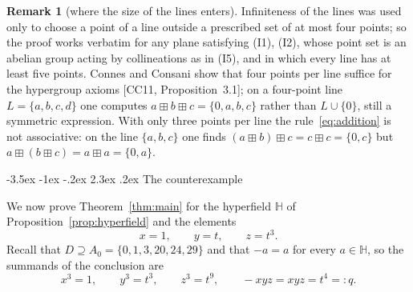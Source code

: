 \documentclass[11pt]{article}
\makeatletter
\renewcommand\section{\@startsection{section}{1}{\z@}
  {-3.5ex \@plus -1ex \@minus -.2ex}
  {2.3ex \@plus.2ex}
  {\normalfont\bfseries}}
\theoremstyle{plain}
\theoremstyle{definition}
\newtheorem{remark}[theorem]{Remark}
\newcommand{\Hh}{\mathbb{H}}
\newcommand{\bp}{\boxplus}
\makeatother
\begin{document}
\begin{remark}[where the size of the lines enters]\label{rem:linesize}
Infiniteness of the lines was used only to choose a point of a line
outside a prescribed set of at most four points; so the proof works
verbatim for any plane satisfying (I1), (I2), whose point set is an
abelian group acting by collineations as in (I5), and in which every
line has at least five points.  Connes and Consani show that four points per
line suffice for the hypergroup axioms [CC11, Proposition~3.1]; on a
four-point line $L=\{a,b,c,d\}$ one computes
$a\bp b\bp c=\{0,a,b,c\}$ rather than $L\cup\{0\}$, still a symmetric
expression.
With only three points per line the rule~\eqref{eq:addition} is not
associative: on the line $\{a,b,c\}$ one finds
$(a\bp b)\bp c=c\bp c=\{0,c\}$ but $a\bp(b\bp c)=a\bp a=\{0,a\}$.
\end{remark}

\section{The counterexample}\label{sec:counterexample}

We now prove Theorem~\ref{thm:main} for the hyperfield $\Hh$ of
Proposition~\ref{prop:hyperfield} and the elements
\[
 x=1,\qquad y=t,\qquad z=t^3 .
\]
Recall that $D\supseteq A_0=\{0,1,3,20,24,29\}$ and that $-a=a$ for
every $a\in\Hh$, so the summands of the conclusion are
\[
 x^3=1,\qquad y^3=t^3,\qquad z^3=t^9,\qquad -xyz=xyz=t^4=:q .
\]
\end{document}
